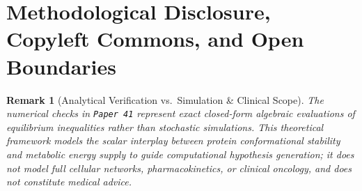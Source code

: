 \documentclass[11pt,a4paper]{article}
\newtheorem{remark}{Remark}
\begin{document}
\section*{Methodological Disclosure, Copyleft Commons, and Open Boundaries}
\begin{remark}[Analytical Verification vs.\ Simulation \& Clinical Scope]
The numerical checks in \texttt{Paper~41} represent exact closed-form algebraic evaluations of equilibrium inequalities rather than stochastic simulations. This theoretical framework models the scalar interplay between protein conformational stability and metabolic energy supply to guide computational hypothesis generation; it does not model full cellular networks, pharmacokinetics, or clinical oncology, and does not constitute medical advice.
\end{remark}
\end{document}
